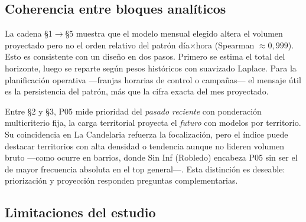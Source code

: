 \subsection{Coherencia entre bloques analíticos}

La cadena §1$\rightarrow$§5 muestra que el modelo mensual elegido altera el volumen proyectado pero no el orden relativo del patrón día$\times$hora (Spearman $\approx 0{,}999$). Esto es consistente con un diseño en dos pasos. Primero se estima el total del horizonte, luego se reparte según pesos históricos con suavizado Laplace. Para la planificación operativa ---franjas horarias de control o campañas--- el mensaje útil es la persistencia del patrón, más que la cifra exacta del mes proyectado.

Entre §2 y §3, P05 mide prioridad del \textit{pasado reciente} con ponderación multicriterio fija, la carga territorial proyecta el \textit{futuro} con modelos por territorio. Su coincidencia en La Candelaria refuerza la focalización, pero el índice puede destacar territorios con alta densidad o tendencia aunque no lideren volumen bruto ---como ocurre en barrios, donde Sin Inf (Robledo) encabeza P05 sin ser el de mayor frecuencia absoluta en el top general---. Esta distinción es deseable: priorización y proyección responden preguntas complementarias.

\subsection{Limitaciones del estudio}

